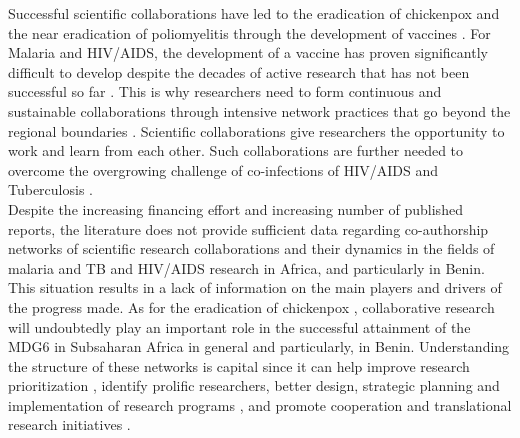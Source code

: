 Successful scientific collaborations have led to the eradication of chickenpox and the near eradication of poliomyelitis through the development of vaccines \cite{jamison_disease_2006}. For Malaria and HIV/AIDS, the development of a vaccine has proven significantly difficult to develop despite the decades of active research that has not been successful so far \cite{long_malaria_2016,titti_problems_2007,walker_toward_2008}. This is why researchers need to form continuous and sustainable collaborations through intensive network practices that go beyond the regional boundaries \cite{newman_structure_2001}. Scientific collaborations give researchers the opportunity to work and learn from each other. Such collaborations are further needed to overcome the overgrowing challenge of co-infections of HIV/AIDS and Tuberculosis \cite{corbett_growing_2003,gandhi_hiv_2010}.\\ %
Despite the increasing financing effort and increasing number of published reports, the literature does not provide sufficient data regarding co-authorship networks of scientific research collaborations and their dynamics in the fields of malaria and TB and HIV/AIDS research in Africa, and particularly in Benin.
This situation results in a lack of information on the main players and drivers of the progress made. As for the eradication of chickenpox \citep{jamison_disease_2006}, collaborative research will undoubtedly play an important role in the successful attainment of the MDG6 in Subsaharan Africa in general and particularly, in Benin. Understanding the structure of these networks is capital since it can help improve research prioritization \citep{ghafouri_social_2014}, identify prolific researchers, better design, strategic planning and implementation of research programs \citep{morel_co-authorship_2009}, and promote cooperation and translational research initiatives \citep{gonzalez-alcaide_scientific_2012}.
